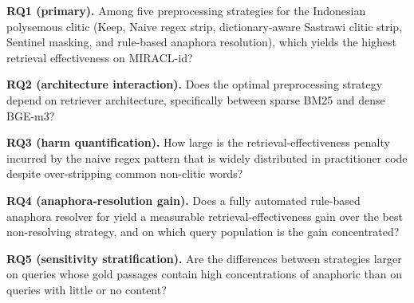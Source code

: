 
\noindent\textbf{RQ1 (primary).} Among five preprocessing strategies for the Indonesian polysemous clitic  (Keep, Naive regex strip, dictionary-aware Sastrawi clitic strip, Sentinel masking, and rule-based anaphora resolution), which yields the highest retrieval effectiveness on MIRACL-id?

\smallskip
\noindent\textbf{RQ2 (architecture interaction).} Does the optimal preprocessing strategy depend on retriever architecture, specifically between sparse BM25 and dense BGE-m3?

\smallskip
\noindent\textbf{RQ3 (harm quantification).} How large is the retrieval-effectiveness penalty incurred by the naive regex  pattern that is widely distributed in practitioner code despite over-stripping common non-clitic words?

\smallskip
\noindent\textbf{RQ4 (anaphora-resolution gain).} Does a fully automated rule-based anaphora resolver for  yield a measurable retrieval-effectiveness gain over the best non-resolving strategy, and on which query population is the gain concentrated?

\smallskip
\noindent\textbf{RQ5 (sensitivity stratification).} Are the differences between strategies larger on queries whose gold passages contain high concentrations of anaphoric  than on queries with little or no  content?
